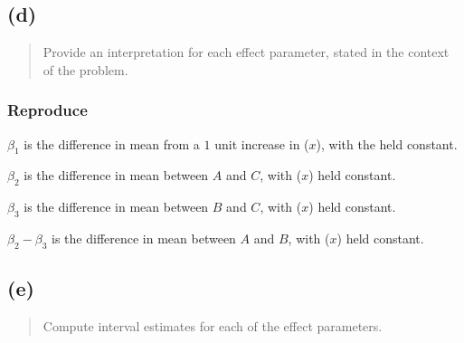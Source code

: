 \documentclass[
]{article}
\begin{document}
\hypertarget{d-2}{%
\subsection{(d)}\label{d-2}}

\begin{quote}
Provide an interpretation for each effect parameter, stated in the
context of the problem.
\end{quote}

\hypertarget{reproduce-15}{%
\subsubsection{Reproduce}\label{reproduce-15}}

\(\beta_1\) is the difference in mean  from a \(1\) unit
increase in  (\(x\)), with the  held
constant.

\(\beta_2\) is the difference in mean  between
 \(A\) and  \(C\), with 
(\(x\)) held constant.

\(\beta_3\) is the difference in mean  between
 \(B\) and  \(C\), with 
(\(x\)) held constant.

\(\beta_2-\beta_3\) is the difference in mean  between
 \(A\) and  \(B\), with 
(\(x\)) held constant.

\hypertarget{e-2}{%
\subsection{(e)}\label{e-2}}

\begin{quote}
Compute interval estimates for each of the effect parameters.
\end{quote}
\end{document}
